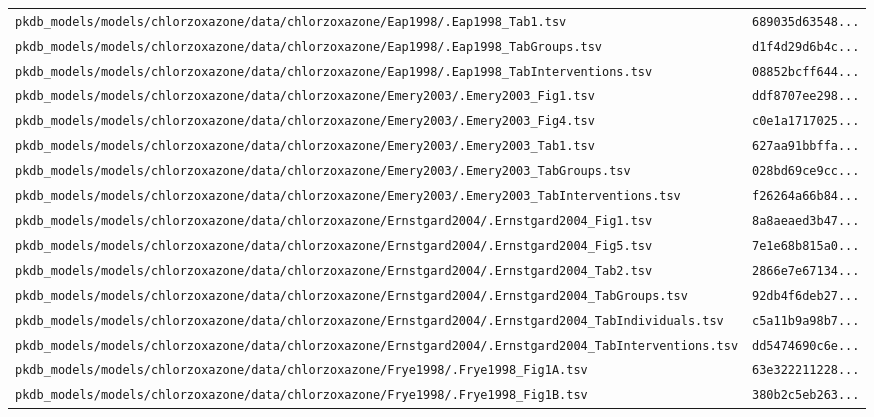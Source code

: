 \documentclass{article}
\begin{document}
\begin{longtable}{ll}
\texttt{pkdb\_models/models/chlorzoxazone/data/chlorzoxazone/Eap1998/.Eap1998\_Tab1.tsv} & \texttt{689035d63548...} \\
\texttt{pkdb\_models/models/chlorzoxazone/data/chlorzoxazone/Eap1998/.Eap1998\_TabGroups.tsv} & \texttt{d1f4d29d6b4c...} \\
\texttt{pkdb\_models/models/chlorzoxazone/data/chlorzoxazone/Eap1998/.Eap1998\_TabInterventions.tsv} & \texttt{08852bcff644...} \\
\texttt{pkdb\_models/models/chlorzoxazone/data/chlorzoxazone/Emery2003/.Emery2003\_Fig1.tsv} & \texttt{ddf8707ee298...} \\
\texttt{pkdb\_models/models/chlorzoxazone/data/chlorzoxazone/Emery2003/.Emery2003\_Fig4.tsv} & \texttt{c0e1a1717025...} \\
\texttt{pkdb\_models/models/chlorzoxazone/data/chlorzoxazone/Emery2003/.Emery2003\_Tab1.tsv} & \texttt{627aa91bbffa...} \\
\texttt{pkdb\_models/models/chlorzoxazone/data/chlorzoxazone/Emery2003/.Emery2003\_TabGroups.tsv} & \texttt{028bd69ce9cc...} \\
\texttt{pkdb\_models/models/chlorzoxazone/data/chlorzoxazone/Emery2003/.Emery2003\_TabInterventions.tsv} & \texttt{f26264a66b84...} \\
\texttt{pkdb\_models/models/chlorzoxazone/data/chlorzoxazone/Ernstgard2004/.Ernstgard2004\_Fig1.tsv} & \texttt{8a8aeaed3b47...} \\
\texttt{pkdb\_models/models/chlorzoxazone/data/chlorzoxazone/Ernstgard2004/.Ernstgard2004\_Fig5.tsv} & \texttt{7e1e68b815a0...} \\
\texttt{pkdb\_models/models/chlorzoxazone/data/chlorzoxazone/Ernstgard2004/.Ernstgard2004\_Tab2.tsv} & \texttt{2866e7e67134...} \\
\texttt{pkdb\_models/models/chlorzoxazone/data/chlorzoxazone/Ernstgard2004/.Ernstgard2004\_TabGroups.tsv} & \texttt{92db4f6deb27...} \\
\texttt{pkdb\_models/models/chlorzoxazone/data/chlorzoxazone/Ernstgard2004/.Ernstgard2004\_TabIndividuals.tsv} & \texttt{c5a11b9a98b7...} \\
\texttt{pkdb\_models/models/chlorzoxazone/data/chlorzoxazone/Ernstgard2004/.Ernstgard2004\_TabInterventions.tsv} & \texttt{dd5474690c6e...} \\
\texttt{pkdb\_models/models/chlorzoxazone/data/chlorzoxazone/Frye1998/.Frye1998\_Fig1A.tsv} & \texttt{63e322211228...} \\
\texttt{pkdb\_models/models/chlorzoxazone/data/chlorzoxazone/Frye1998/.Frye1998\_Fig1B.tsv} & \texttt{380b2c5eb263...} \\

\end{longtable}
\end{document}
